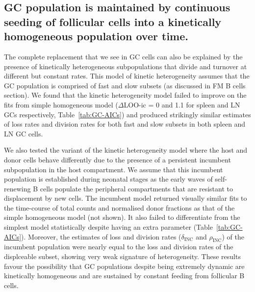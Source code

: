 \documentclass[11pt]{article}
\newcommand{\red}[1]{{\color{red}{#1}}}
\begin{document}
\subsection*{GC population is maintained by continuous seeding of follicular cells into a kinetically homogeneous population over time.}
The complete replacement that we see in GC cells can also be explained by the presence of kinetically heterogeneous subpopulations that divide and turnover at different but constant rates. 
This model of kinetic heterogeneity assumes that the GC population is comprised of fast and slow subsets (as discussed in FM B cells section).
We found that the kinetic heterogeneity model failed to improve on the fits from simple homogeneous model ($\Delta$LOO-ic = 0 and 1.1 for spleen and LN GCs respectively, Table~\ref{tab:GC-AICs}) and produced  strikingly similar estimates of loss rates and division rates for both fast and slow subsets in both spleen and LN GC cells.

We also tested the variant of the kinetic heterogeneity model where the host and donor cells behave differently due to the presence of a persistent incumbent subpopulation in the host compartment.
We assume that this incumbent population is established during neonatal stages as the early waves of self-renewing B cells populate the peripheral compartments that are resistant to displacement by new cells.
The incumbent model returned visually similar fits to the time-course of total counts and normalised donor fractions as that of the simple homogeneous model (not shown).
It also failed to differentiate from the simplest model statistically despite having an extra parameter (Table~\ref{tab:GC-AICs}).
Moreover, the estimates of loss and division rates ($\delta_{\text{INC}}$ and $\rho_{\text{INC}}$) of the incumbent population were nearly equal to the loss and division rates of the displceable subset, showing very weak signature of heterogeneity.
These results favour the possibility that GC populations despite being extremely dynamic are kinetically homogeneous and are sustained by constant feeding from follicular B cells.

\end{document}
